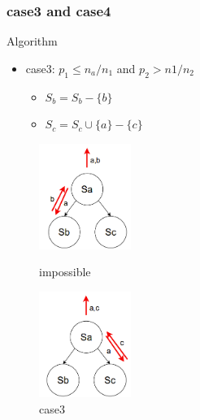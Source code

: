 \documentclass[notheorems, aspectratio=54]{beamer}
\begin{document}
\begin{frame}
    \frametitle{case3 and case4}
    \begin{block}{Algorithm}
        \begin{itemize}
            \item case3: $p_1 \leq n_a/n_1$  and  $p_2 > n1/n_2$
            \begin{itemize}
                \item $S_b = S_b - \{b\}$
                \item $S_c = S_c \cup \{a\} - \{c\}$
            \end{itemize}
        \end{itemize} 
    \end{block}
    \begin{figure}[htbp]
        \centering
        \begin{minipage}[t]{0.48\textwidth}
        \centering
        \includegraphics[width=3cm]{global_img_dir/Sampling3.png}
        \caption{impossible}
        \end{minipage}
        \begin{minipage}[t]{0.48\textwidth}
        \centering
        \includegraphics[width=3cm]{global_img_dir/Sampling4.png}
        \caption{case3}
        \end{minipage}
    \end{figure}
\end{frame}
\end{document}
